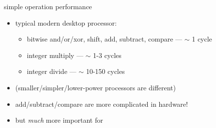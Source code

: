 \begin{frame}{simple operation performance}
    \begin{itemize}
    \item typical modern desktop processor:
        \begin{itemize}
        \item bitwise and/or/xor, shift, add, subtract, compare --- $\sim$ 1 cycle
        \item integer multiply --- $\sim$ 1-3 cycles
        \item integer divide --- $\sim$ 10-150 cycles
        \end{itemize}
    \item (smaller/simpler/lower-power processors are different)
    \vspace{.5cm}
    \item<2-> add/subtract/compare are more complicated in hardware!
    \item<2-> but \textit{much} more important for 
    \end{itemize}
\end{frame}
